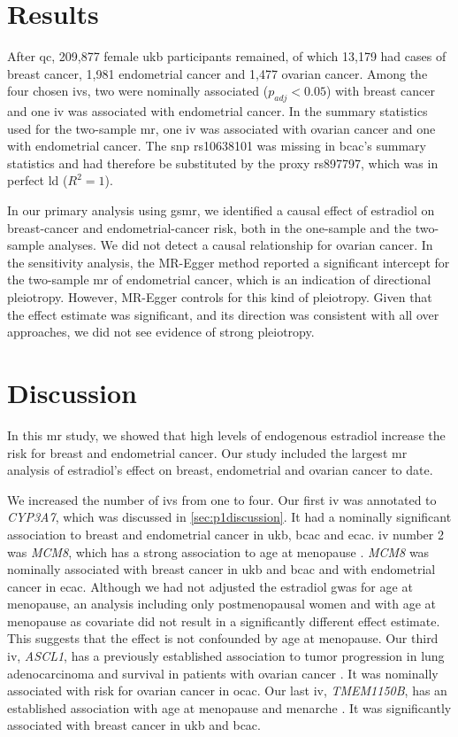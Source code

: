 \documentclass[draft]{scrbook}
\begin{document}
\section{Results}
After \gls{qc}, 209,877 female \gls{ukb} participants remained, of which 13,179 had cases of breast cancer, 1,981 endometrial cancer and 1,477 ovarian cancer.
Among the four chosen \glspl{iv}, two were nominally associated ($p_{adj} < 0.05$) with breast cancer and one \gls{iv} was associated with endometrial cancer.
In the summary statistics used for the two-sample \gls{mr}, one \gls{iv} was associated with ovarian cancer and one with endometrial cancer.
The \gls{snp} rs10638101 was missing in \gls{bcac}'s summary statistics and had therefore be substituted by the proxy rs897797, which was in perfect \gls{ld} ($R^2 = 1$).

In our primary analysis using \textsf{gsmr}, we identified a causal effect of estradiol on breast-cancer and endometrial-cancer risk, both in the one-sample and the two-sample analyses.
We did not detect a causal relationship for ovarian cancer.
In the sensitivity analysis, the MR-Egger method reported a significant intercept for the two-sample \gls{mr} of endometrial cancer, which is an indication of directional pleiotropy.
However, MR-Egger controls for this kind of pleiotropy.
Given that the effect estimate was significant, and its direction was consistent with all over approaches, we did not see evidence of strong pleiotropy.

\section{Discussion}
In this \gls{mr} study, we showed that high levels of endogenous estradiol increase the risk for breast and endometrial cancer.
Our study included the largest \gls{mr} analysis of estradiol's effect on breast, endometrial and ovarian cancer to date.

We increased the number of \glspl{iv} from one to four.
Our first \gls{iv} was annotated to \textit{CYP3A7}, which was discussed in \cref{sec:p1discussion}.
It had a nominally significant association to breast and endometrial cancer in \gls{ukb}, \gls{bcac} and \gls{ecac}.
\Gls{iv} number 2 was \textit{MCM8}, which has a strong association to age at menopause \cite{Chen2014}.
\textit{MCM8} was nominally associated with breast cancer in \gls{ukb} and \gls{bcac} and with endometrial cancer in \gls{ecac}.
Although we had not adjusted the estradiol \gls{gwas} for age at menopause, an analysis including only postmenopausal women and with age at menopause as covariate did not result in a significantly different effect estimate.
This suggests that the effect is not confounded by age at menopause.
Our third \gls{iv}, \textit{ASCL1}, has a previously established association to tumor progression in lung adenocarcinoma  and survival in patients with ovarian cancer \cite{Miyashita2020,Moore2017}.
It was nominally associated with risk for ovarian cancer in \gls{ocac}.
Our last \gls{iv}, \textit{TMEM1150B}, has an established association with age at menopause and menarche \cite{Stolk2012,Pickrell2016}.
It was significantly associated with breast cancer in \gls{ukb} and \gls{bcac}.
\end{document}
